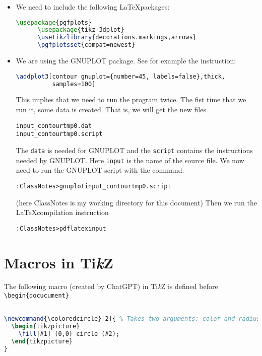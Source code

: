 \documentclass[12pt]{article}
\newcommand{\myTikZ}{Ti\textit{k}Z }
\newcommand{\myLaTeX}{\LaTeX \space  }
\newcommand{\coloredcircle}[2]{ %
  \begin{tikzpicture}
    \fill[#1] (0,0) circle (#2);
  \end{tikzpicture}
}
\begin{document}
\begin{itemize}
  \item We  need to include the following \myLaTeX packages:
    \begin{lstlisting}[language=tex]
      \usepackage{pgfplots}
      \usepackage{tikz-3dplot}
      \usetikzlibrary{decorations.markings,arrows}
      \pgfplotsset{compat=newest}
    \end{lstlisting}

  \item We are using the GNUPLOT package. 
    See for example the instruction:
    \begin{lstlisting}[language=tex]
      \addplot3[contour gnuplot={number=45, labels=false},thick, 
          samples=100] 
    \end{lstlisting}

    This implies that we need to run the program twice. The fist time that we 
    run it, some data is created. That is, we will get the new files
    \begin{alltt}
      input_contourtmp0.dat
      input_contourtmp0.script
    \end{alltt}
    The \texttt{data} is needed for GNUPLOT and the \texttt{script} contains the instructions
    needed by GNUPLOT. Here \texttt{input} is the name of the source file. 
    We now need to run the GNUPLOT script with the command:

    \begin{alltt}
      :ClassNotes>gnuplot input_contourtmp0.script 
    \end{alltt}
    (here ClassNotes is my working directory for this document)
    Then we run the \myLaTeX compilation instruction
    \begin{alltt}
      :ClassNotes>pdflatex input
    \end{alltt}


    

\end{itemize}

\section{Macros in \myTikZ}
The following macro (created by ChatGPT) in \myTikZ is defined before 
\texttt{\textbackslash begin\{docucument\}}

\begin{lstlisting}[language=tex]

\newcommand{\coloredcircle}[2]{ % Takes two arguments: color and radius
  \begin{tikzpicture}
    \fill[#1] (0,0) circle (#2);
  \end{tikzpicture}
}
\end{lstlisting}
\end{document}
